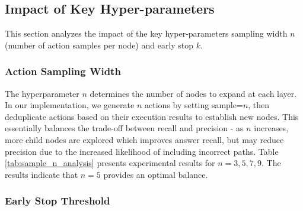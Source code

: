 \subsection{Impact of Key Hyper-parameters}

This section analyzes the impact of the key hyper-parameters sampling width $n$ (number of action samples per node) and early stop $k$.

\subsubsection{Action Sampling Width}

\begin{table}
\caption{Results with different action sampling widths.}
\label{tab:sample_n_analysis}
\end{table}

The hyperparameter $n$ determines the number of nodes to expand at each layer. In our implementation, we generate $n$ actions by setting sample=$n$, then deduplicate actions based on their execution results to establish new nodes.
This essentially balances the trade-off between recall and precision - as $n$ increases, more child nodes are explored which improves answer recall, but may reduce precision due to the increased likelihood of including incorrect paths.
Table \ref{tab:sample_n_analysis} presents experimental results for $n=3,5,7,9$. The results indicate that $n=5$ provides an optimal balance.

\subsubsection{Early Stop Threshold}
\label{sec:early_stop_analysis}

